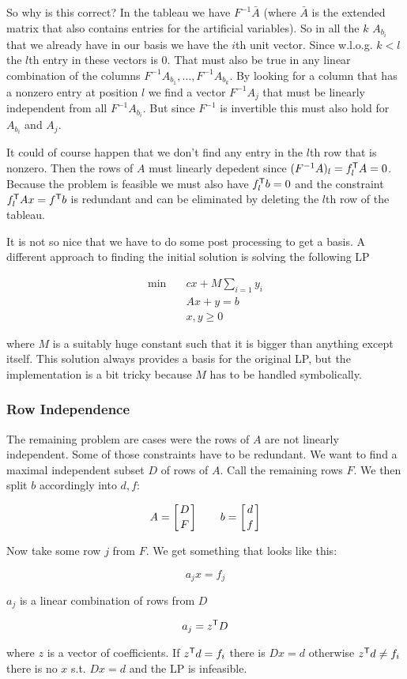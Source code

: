 So why is this correct? In the tableau we have $F^{-1}\bar A$ (where $\bar A$ is the extended matrix that also contains entries for the artificial variables). So in all the $k$ $A_{b_i}$ that we already have in our basis we have the $i$th unit vector. Since w.l.o.g. $k<l$ the $l$th entry in these vectors is $0$. That must also be true in any linear combination of the columns $F^{-1}A_{b_1},\ldots, F^{-1}A_{b_k}$. By looking for a column that has a nonzero entry at position $l$ we find a vector $F^{-1}A_j$ that must be linearly independent from all $F^{-1}A_{b_i}$. But since $F^{-1}$ is invertible this must also hold for $A_{b_i}$ and $A_j$.

It could of course happen that we don't find any entry in the $l$th row that is nonzero. Then the rows of $A$ must linearly depedent since $(F^{-1}A)_l={f}^\text{\upshape \sffamily T}_l A=0$. Because the problem is feasible we must also have ${f}^\text{\upshape \sffamily T}_l b = 0$ and the constraint ${f}^\text{\upshape \sffamily T}_l A x = {f}^\text{\upshape \sffamily T} b$ is redundant and can be eliminated by deleting the $l$th row of the tableau. 

It is not so nice that we have to do some post processing to get a basis. A different approach to finding the initial solution is solving the following LP

\begin{align*}
\min \quad & cx + M\sum_{i=1} y_i\\
&Ax+y=b\\
&x,y\geq 0
\end{align*}

where $M$ is a suitably huge constant such that it is bigger than anything except itself. This solution always provides a basis for the original LP, but the implementation is a bit tricky because $M$ has to be handled symbolically.

\subsubsection*{Row Independence}

The remaining problem are cases were the rows of $A$ are not linearly independent. Some of those constraints have to be redundant. We want to find a maximal independent subset $D$ of rows of $A$. Call the remaining rows $F$. We then split $b$ accordingly into $d,f$:

\[A=\left[ D \atop F\right] \qquad b = \left[d\atop f\right]\]

Now take some row $j$ from $F$. We get something that looks like this:

\[a_jx=f_j\]

$a_j$ is a linear combination of rows from $D$

\[a_j={z}^\text{\upshape \sffamily T} D\]

where $z$ is a vector of coefficients. If ${z}^\text{\upshape \sffamily T} d = f_i$ there is $Dx=d$ otherwise ${z}^\text{\upshape \sffamily T} d \neq f_i$ there is no $x$ s.t. $Dx=d$ and the LP is infeasible.
